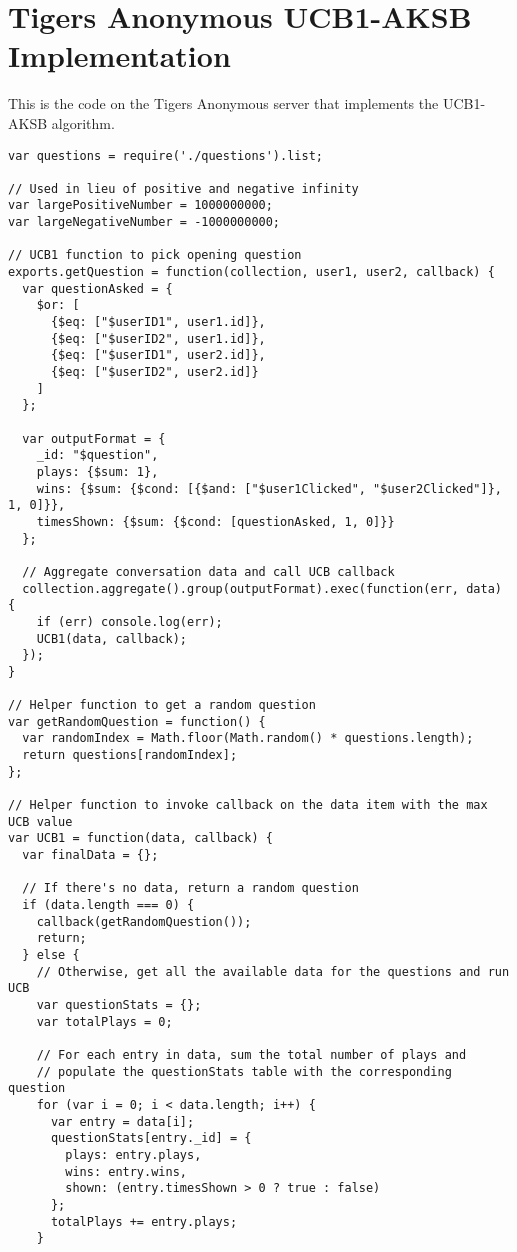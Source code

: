 \section{Tigers Anonymous UCB1-AKSB Implementation}

This is the code on the Tigers Anonymous server that implements the UCB1-AKSB algorithm.

\begin{lstlisting}
var questions = require('./questions').list;

// Used in lieu of positive and negative infinity
var largePositiveNumber = 1000000000;
var largeNegativeNumber = -1000000000;

// UCB1 function to pick opening question
exports.getQuestion = function(collection, user1, user2, callback) {
  var questionAsked = {
    $or: [
      {$eq: ["$userID1", user1.id]}, 
      {$eq: ["$userID2", user1.id]}, 
      {$eq: ["$userID1", user2.id]}, 
      {$eq: ["$userID2", user2.id]}
    ]
  };

  var outputFormat = {
    _id: "$question",
    plays: {$sum: 1},
    wins: {$sum: {$cond: [{$and: ["$user1Clicked", "$user2Clicked"]}, 1, 0]}},
    timesShown: {$sum: {$cond: [questionAsked, 1, 0]}}
  };

  // Aggregate conversation data and call UCB callback
  collection.aggregate().group(outputFormat).exec(function(err, data) {
    if (err) console.log(err);
    UCB1(data, callback);
  });
}

// Helper function to get a random question
var getRandomQuestion = function() {
  var randomIndex = Math.floor(Math.random() * questions.length);
  return questions[randomIndex];
};

// Helper function to invoke callback on the data item with the max UCB value
var UCB1 = function(data, callback) {
  var finalData = {};

  // If there's no data, return a random question
  if (data.length === 0) {
    callback(getRandomQuestion());
    return;
  } else {
    // Otherwise, get all the available data for the questions and run UCB
    var questionStats = {};
    var totalPlays = 0;

    // For each entry in data, sum the total number of plays and
    // populate the questionStats table with the corresponding question
    for (var i = 0; i < data.length; i++) {
      var entry = data[i];
      questionStats[entry._id] = {
        plays: entry.plays,
        wins: entry.wins,
        shown: (entry.timesShown > 0 ? true : false)
      };
      totalPlays += entry.plays;
    }


\end{lstlisting}
